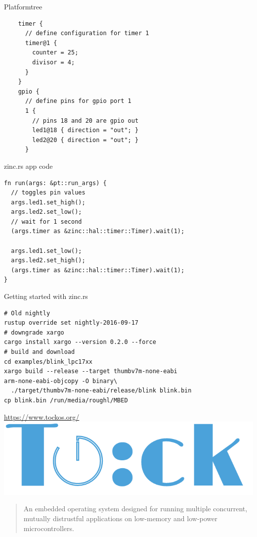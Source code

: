 \documentclass[aspectratio=1610,14pt,t]{beamer}
\begin{document}
\begin{frame}[c,fragile]{Platformtree}
  \begin{verbatim}
    timer {
      // define configuration for timer 1
      timer@1 {
        counter = 25;
        divisor = 4;
      }
    }
    gpio {
      // define pins for gpio port 1
      1 {
        // pins 18 and 20 are gpio out
        led1@18 { direction = "out"; }
        led2@20 { direction = "out"; }
      }
  \end{verbatim}
\end{frame}

\begin{frame}[c,fragile]{zinc.rs app code}
  \begin{verbatim}
fn run(args: &pt::run_args) {
  // toggles pin values
  args.led1.set_high();
  args.led2.set_low();
  // wait for 1 second
  (args.timer as &zinc::hal::timer::Timer).wait(1);

  args.led1.set_low();
  args.led2.set_high();
  (args.timer as &zinc::hal::timer::Timer).wait(1);
}
  \end{verbatim}
\end{frame}

\begin{frame}[fragile]{Getting started with zinc.rs}
  \begin{verbatim}
# Old nightly
rustup override set nightly-2016-09-17
# downgrade xargo
cargo install xargo --version 0.2.0 --force
# build and download
cd examples/blink_lpc17xx
xargo build --release --target thumbv7m-none-eabi
arm-none-eabi-objcopy -O binary\
  ./target/thumbv7m-none-eabi/release/blink blink.bin
cp blink.bin /run/media/roughl/MBED
  \end{verbatim}
\end{frame}


\begin{frame}[c]{\url{https://www.tockos.org/}}
  \centering
  \includegraphics[width=.8\textwidth]{img/tock.png}

  \begin{quote}
    An embedded operating system designed for running multiple concurrent,
    mutually distrustful applications on low-memory and low-power
    microcontrollers.
  \end{quote}
\end{frame}
\end{document}
